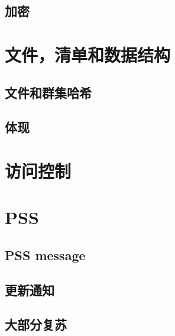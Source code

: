 \subsection{加密\statusyellow}\label{spec:format:encryption}


\section{文件，清单和数据结构\statusyellow}\label{spec:format:data-structures}
\subsection{文件和群集哈希\statusyellow}\label{spec:format:files}

\subsection{体现\statusyellow}\label{spec:format:manifests}

%


\section{访问控制\statusgreen}\label{spec:format:access-control}


\section{PSS \statusyellow}

\subsection{PSS message\statusgreen}
\label{spec:format:pss-messsage}

\subsection{更新通知\statusred}\label{spec:format:update-notifications}
%

\subsection{大部分复苏\statusyellow}\label{spec:format:recovery}


